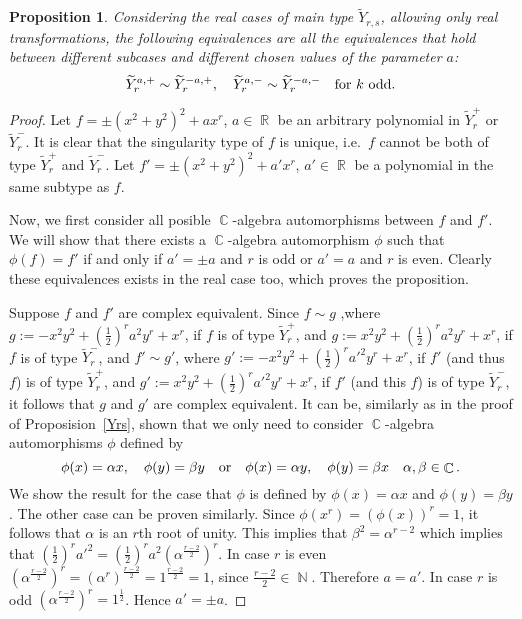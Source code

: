 \documentclass[noend]{amsproc}
\newtheorem{prop}[theorem]{Proposition}
\theoremstyle{definition}
\DeclareMathOperator{\N}{\mathbb{N}}
\DeclareMathOperator{\R}{\mathbb{R}}
\DeclareMathOperator{\C}{\mathbb{C}}
\begin{document}
\begin{prop}
Considering the real cases of main type $\widetilde Y_{r,s}$, allowing only real transformations, the following equivalences are all the equivalences that hold between different subcases and different chosen values of the parameter $a$:
\[\widetilde Y_{r}^{a,+}\sim\widetilde Y_{r}^{-a,+}, \quad\widetilde Y_{r}^{a,-}\sim\widetilde Y_{r}^{-a,-}\quad\textnormal{for $k$ odd}.\]
\end{prop}
\begin{proof}
Let $f=\pm(x^2+y^2)^2+ax^r$, $a\in\R$ be an arbitrary polynomial in $\widetilde Y_{r}^+$ or $\widetilde Y_{r}^-$. It is clear that the singularity type of $f$ is unique, i.e.~$f$ cannot be both of type $\widetilde Y_{r}^+$ and $\widetilde Y_{r}^-$. Let $f'=\pm(x^2+y^2)^2+a'x^r$, $a'\in\R$ be a polynomial in the same subtype as $f$.

Now, we first consider all posible $\C$-algebra automorphisms between $f$ and $f'$. We will show that there exists a $\C$-algebra automorphism $\phi$ such that $\phi(f)=f'$ if and only if $a'=\pm a$ and $r$ is odd or $a'=a$ and $r$ is even. Clearly these equivalences exists in the real case too, which proves the proposition.

Suppose $f$ and $f'$ are complex equivalent. Since $f\sim g$ ,where $g:=-x^2y^2+(\frac{1}{2})^ra^2y^r+x^r$, if $f$ is of type $\widetilde Y_r^+$, and $g:=x^2y^2+(\frac{1}{2})^ra^2y^r+x^r$, if $f$ is of type $\widetilde Y_r^-$, and $f'\sim g'$, where $g':= -x^2y^2+(\frac{1}{2})^ra'^2y^r+x^r$, if $f'$ (and thus $f$) is of type $\widetilde Y_r^+$, and $g':=x^2y^2+(\frac{1}{2})^ra'^2y^r+x^r$, if $f'$ (and this $f$) is of type $\widetilde Y_r^-$, it follows that $g$ and $g'$ are complex equivalent. It can be, similarly as in the proof of Proposision~\ref{Yrs}, shown that we only need to consider $\C$-algebra automorphisms $\phi$ defined by
\[\phi(x)=\alpha x,\quad \phi(y) = \beta y\quad \textnormal{or}\quad\phi(x)=\alpha y,\quad \phi(y)=\beta x\quad\alpha,\beta\in\C.\]
We show the result for the case that $\phi$ is defined by $\phi(x)=\alpha x$ and $\phi(y)=\beta y$. The other case can be proven similarly.
Since $\phi(x^r)=(\phi(x))^r=1$, it follows that $\alpha$ is an $r$th root of unity. This implies that $\beta^2=\alpha^{r-2}$ which implies that  $(\frac{1}{2})^ra'^2=(\frac{1}{2})^ra^2(\alpha^{\frac{r-2}{2}})^r$. In case $r$ is even $(\alpha^{\frac{r-2}{2}})^r=(\alpha^r)^{\frac{r-2}{2}}=1^{\frac{r-2}{2}}=1$, since $\frac{r-2}{2}\in\N$. Therefore $a=a'$. In case $r$ is odd $(\alpha^{\frac{r-2}{2}})^r=1^{\frac{1}{2}}$. Hence $a'=\pm a$. 

\end{proof}
\end{document}
